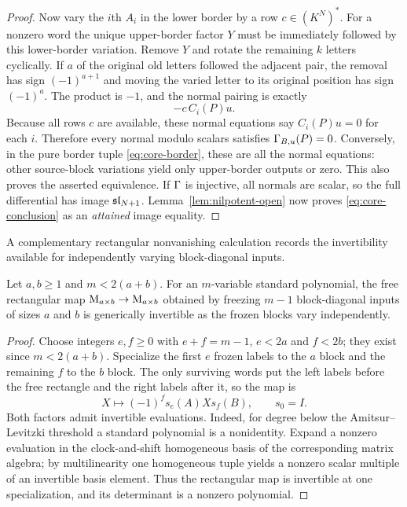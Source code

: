 \begin{proof}
Now vary the $i$th $A_i$ in the lower border by a row
$c\in(K^N)^*$. For a nonzero word the unique upper-border
factor $Y$ must be immediately followed by this lower-border
variation. Remove $Y$ and rotate the remaining $k$ letters
cyclically. If $a$ of the original old letters followed the
adjacent pair, the removal has sign $(-1)^{a+1}$ and moving
the varied letter to its original position has sign $(-1)^a$.
The product is $-1$, and the normal pairing is exactly
\begin{equation}\label{eq:core-low-normal}
 -c\,C_i(P)u.
\end{equation}
Because all rows $c$ are available, these normal equations say
$C_i(P)u=0$ for each $i$. Therefore every normal modulo
scalars satisfies $\Gamma_{B,u}(P)=0$. Conversely, in the pure
border tuple \eqref{eq:core-border}, these are all the normal
equations: other source-block variations yield only upper-border
outputs or zero. This also proves the asserted equivalence.
If $\Gamma$ is injective, all normals are scalar, so the
full differential has image $\mathfrak{sl}_{N+1}$.
Lemma~\ref{lem:nilpotent-open} now proves
\eqref{eq:core-conclusion} as an \emph{attained} image equality.
\end{proof}

A complementary rectangular nonvanishing calculation records the
invertibility available for independently varying block-diagonal inputs.
\begin{lemma}\label{lem:mixed-rect}
Let $a,b\ge1$ and $m<2(a+b)$. For an $m$-variable standard
polynomial, the free rectangular map
$\mathrm{M}_{a\times b}\to\mathrm{M}_{a\times b}$ obtained by freezing
$m-1$ block-diagonal inputs of sizes $a$ and $b$ is generically
invertible as the frozen blocks vary independently.
\end{lemma}
\begin{proof}
Choose integers $e,f\ge0$ with $e+f=m-1$,
$e<2a$ and $f<2b$; they exist since $m<2(a+b)$.
Specialize the first $e$ frozen labels to the $a$ block and
the remaining $f$ to the $b$ block. The only surviving words
put the left labels before the free rectangle and the right
labels after it, so the map is
\begin{equation}\label{eq:mixed-rect}
 X\longmapsto(-1)^f s_e(A)X s_f(B),\qquad s_0=I.
\end{equation}
Both factors admit invertible evaluations. Indeed, for degree
below the Amitsur--Levitzki threshold a standard polynomial
is a nonidentity. Expand a nonzero evaluation in the
clock-and-shift homogeneous basis of the corresponding matrix
algebra; by multilinearity one homogeneous tuple yields a
nonzero scalar multiple of an invertible basis element.
Thus the rectangular map is invertible at one specialization,
and its determinant is a nonzero polynomial.
\end{proof}

